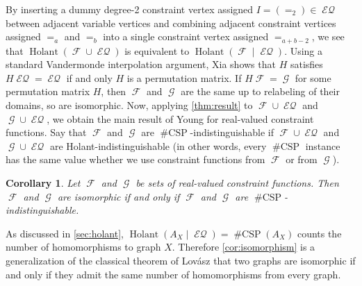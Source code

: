 \documentclass{article}
\newtheorem{corollary}{Corollary}[section]
\theoremstyle{remark}
\theoremstyle{definition}
\DeclareMathOperator{\fc}{\mathcal{F}}
\DeclareMathOperator{\gc}{\mathcal{G}}
\DeclareMathOperator{\holant}{Holant}
\DeclareMathOperator{\csp}{\#CSP}
\DeclareMathOperator{\eq}{\mathcal{EQ}}
\begin{document}
By inserting a dummy degree-2 constraint vertex assigned $I = (=_2) \in \eq$ between adjacent variable vertices and combining adjacent constraint
vertices assigned $=_a$ and $=_b$ into a single constraint vertex assigned $=_{a+b-2}$, we see that
$\holant(\fc \cup \eq)$ is equivalent to $\holant(\fc \mid \eq)$. Using a standard Vandermonde
interpolation argument, Xia \cite{xia} shows that $H$ satisfies $H \eq = \eq$ if and only
$H$ is a permutation matrix. If $H\fc = \gc$ for some permutation matrix $H$, then $\fc$ and $\gc$
are the same up to relabeling of their domains, so are isomorphic. 
Now, applying \autoref{thm:result} to $\fc \cup \eq$ and $\gc \cup
\eq$, we obtain the main result of Young \cite{young2022equality} for real-valued constraint functions.
Say that $\fc$ and $\gc$ are $\csp$-indistinguishable if $\fc\cup\eq$ and $\gc\cup\eq$ are 
Holant-indistinguishable (in other words, every $\csp$ instance has the same value whether we use 
constraint functions from $\fc$ or from $\gc$).
\begin{corollary}
    Let $\fc$ and $\gc$ be sets of real-valued constraint functions.
    Then $\fc$ and $\gc$ are isomorphic if and only if $\fc$ and $\gc$ are $\csp$-indistinguishable.
    \label{cor:isomorphism}
\end{corollary}
As discussed in \autoref{sec:holant}, 
$\holant(A_X \mid \eq) = \csp(A_X)$ counts the number of homomorphisms to graph $X$. Therefore
\autoref{cor:isomorphism} is a generalization of the classical theorem of Lovász \cite{lovasz_operations}
that two graphs are isomorphic if and only if they admit the same number of homomorphisms from every
graph.
\end{document}

